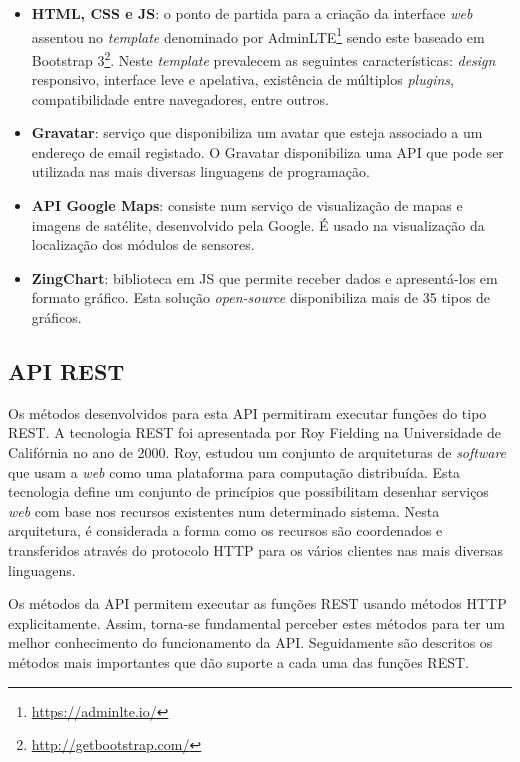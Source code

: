 \begin{itemize}
	\item \textbf{\acs{HTML}, \acs{CSS} e \acs{JS}}: o ponto de partida para a criação da interface \textit{web} assentou no \textit{template} denominado por AdminLTE\footnote{\url{https://adminlte.io/}} sendo este baseado em Bootstrap 3\footnote{\url{http://getbootstrap.com/}}. Neste \textit{template} prevalecem as seguintes características:  \textit{design} responsivo, interface leve e apelativa, existência de múltiplos \textit{plugins}, compatibilidade entre navegadores, entre outros. 
	
	\item \textbf{Gravatar}: serviço que disponibiliza um avatar que esteja associado a um endereço de email registado. O Gravatar disponibiliza uma \ac{API} que pode ser utilizada nas mais diversas linguagens de programação\cite{gravatar}.
	 
	\item \textbf{\ac{API} Google Maps}: consiste num serviço de visualização de mapas e imagens de satélite, desenvolvido pela Google. É usado na visualização da localização dos módulos de sensores. 
	
	\item \textbf{ZingChart}: biblioteca em \ac{JS} que permite receber dados e apresentá-los em formato gráfico. Esta solução \textit{open-source} disponibiliza mais de 35 tipos de gráficos. 
\end{itemize}

\subsection{\acs{API} \acs{REST}}


Os métodos desenvolvidos para esta \ac{API} permitiram executar funções do tipo \ac{REST}. A tecnologia \ac{REST} foi apresentada por Roy Fielding na Universidade de Califórnia no ano de 2000\cite{restpaper}. Roy, estudou um conjunto de arquiteturas de \textit{software} que usam a \textit{web} como uma plataforma para computação distribuída\cite{restpaper}. Esta tecnologia define um conjunto de princípios que possibilitam desenhar serviços \textit{web} com base nos recursos existentes num determinado sistema. Nesta arquitetura, é considerada a forma como os recursos são coordenados e transferidos através do protocolo \ac{HTTP} para os vários clientes nas mais diversas linguagens. 

Os métodos da API permitem executar as funções \ac{REST} usando métodos \ac{HTTP} explicitamente. Assim, torna-se fundamental perceber estes métodos para ter um melhor conhecimento do funcionamento da \ac{API}. Seguidamente são descritos os métodos mais importantes que dão suporte a cada uma das funções \ac{REST}.



